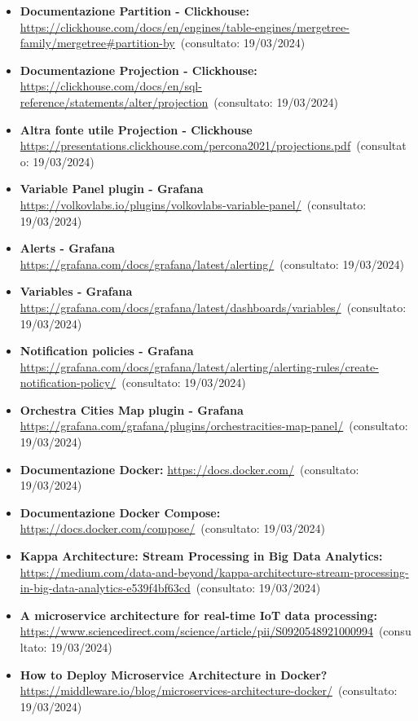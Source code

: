 \begin{itemize}
    \item \textbf{Documentazione Partition - Clickhouse:} \url{https://clickhouse.com/docs/en/engines/table-engines/mergetree-family/mergetree#partition-by}~(consultato: 19/03/2024)
    \item \textbf{Documentazione Projection - Clickhouse:} \url{https://clickhouse.com/docs/en/sql-reference/statements/alter/projection}~(consultato: 19/03/2024)
    \item \textbf{Altra fonte utile Projection - Clickhouse} \url{https://presentations.clickhouse.com/percona2021/projections.pdf}~(consultato: 19/03/2024)
    \item  \textbf{Variable Panel plugin - Grafana} \url{https://volkovlabs.io/plugins/volkovlabs-variable-panel/}~(consultato: 19/03/2024)
    \item  \textbf{Alerts - Grafana} \url{https://grafana.com/docs/grafana/latest/alerting/}~(consultato: 19/03/2024)
    \item \textbf{Variables - Grafana} \url{https://grafana.com/docs/grafana/latest/dashboards/variables/}~(consultato: 19/03/2024)
    \item  \textbf{Notification policies - Grafana} \url{https://grafana.com/docs/grafana/latest/alerting/alerting-rules/create-notification-policy/}~(consultato: 19/03/2024)
    \item  \textbf{Orchestra Cities Map plugin - Grafana} \url{https://grafana.com/grafana/plugins/orchestracities-map-panel/}~(consultato: 19/03/2024)
    \item \textbf{Documentazione Docker:} \url{https://docs.docker.com/}~(consultato: 19/03/2024)
    \item \textbf{Documentazione Docker Compose:} \url{https://docs.docker.com/compose/}~(consultato: 19/03/2024)
    \item \textbf{Kappa Architecture: Stream Processing in Big Data Analytics:} \url{https://medium.com/data-and-beyond/kappa-architecture-stream-processing-in-big-data-analytics-e539f4bf63cd}~(consultato: 19/03/2024)
    \item  \textbf{A microservice architecture for real-time IoT data processing:}  \url{https://www.sciencedirect.com/science/article/pii/S0920548921000994}~(consultato: 19/03/2024)
    \item \textbf{How to Deploy Microservice Architecture in Docker?} \url{https://middleware.io/blog/microservices-architecture-docker/}~(consultato: 19/03/2024)
\end{itemize}
